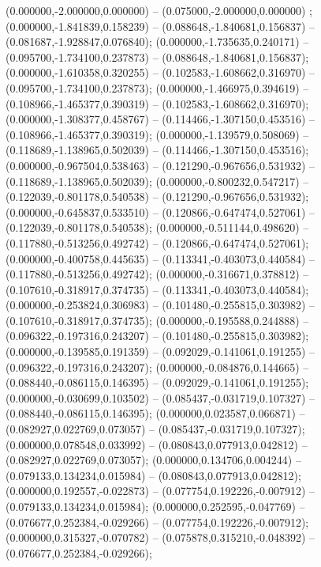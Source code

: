  (0.000000,-2.000000,0.000000) -- (0.075000,-2.000000,0.000000) ;
 (0.000000,-1.841839,0.158239) -- (0.088648,-1.840681,0.156837) -- (0.081687,-1.928847,0.076840);
 (0.000000,-1.735635,0.240171) -- (0.095700,-1.734100,0.237873) -- (0.088648,-1.840681,0.156837);
 (0.000000,-1.610358,0.320255) -- (0.102583,-1.608662,0.316970) -- (0.095700,-1.734100,0.237873);
 (0.000000,-1.466975,0.394619) -- (0.108966,-1.465377,0.390319) -- (0.102583,-1.608662,0.316970);
 (0.000000,-1.308377,0.458767) -- (0.114466,-1.307150,0.453516) -- (0.108966,-1.465377,0.390319);
 (0.000000,-1.139579,0.508069) -- (0.118689,-1.138965,0.502039) -- (0.114466,-1.307150,0.453516);
 (0.000000,-0.967504,0.538463) -- (0.121290,-0.967656,0.531932) -- (0.118689,-1.138965,0.502039);
 (0.000000,-0.800232,0.547217) -- (0.122039,-0.801178,0.540538) -- (0.121290,-0.967656,0.531932);
 (0.000000,-0.645837,0.533510) -- (0.120866,-0.647474,0.527061) -- (0.122039,-0.801178,0.540538);
 (0.000000,-0.511144,0.498620) -- (0.117880,-0.513256,0.492742) -- (0.120866,-0.647474,0.527061);
 (0.000000,-0.400758,0.445635) -- (0.113341,-0.403073,0.440584) -- (0.117880,-0.513256,0.492742);
 (0.000000,-0.316671,0.378812) -- (0.107610,-0.318917,0.374735) -- (0.113341,-0.403073,0.440584);
 (0.000000,-0.253824,0.306983) -- (0.101480,-0.255815,0.303982) -- (0.107610,-0.318917,0.374735);
 (0.000000,-0.195588,0.244888) -- (0.096322,-0.197316,0.243207) -- (0.101480,-0.255815,0.303982);
 (0.000000,-0.139585,0.191359) -- (0.092029,-0.141061,0.191255) -- (0.096322,-0.197316,0.243207);
 (0.000000,-0.084876,0.144665) -- (0.088440,-0.086115,0.146395) -- (0.092029,-0.141061,0.191255);
 (0.000000,-0.030699,0.103502) -- (0.085437,-0.031719,0.107327) -- (0.088440,-0.086115,0.146395);
 (0.000000,0.023587,0.066871) -- (0.082927,0.022769,0.073057) -- (0.085437,-0.031719,0.107327);
 (0.000000,0.078548,0.033992) -- (0.080843,0.077913,0.042812) -- (0.082927,0.022769,0.073057);
 (0.000000,0.134706,0.004244) -- (0.079133,0.134234,0.015984) -- (0.080843,0.077913,0.042812);
 (0.000000,0.192557,-0.022873) -- (0.077754,0.192226,-0.007912) -- (0.079133,0.134234,0.015984);
 (0.000000,0.252595,-0.047769) -- (0.076677,0.252384,-0.029266) -- (0.077754,0.192226,-0.007912);
 (0.000000,0.315327,-0.070782) -- (0.075878,0.315210,-0.048392) -- (0.076677,0.252384,-0.029266);
